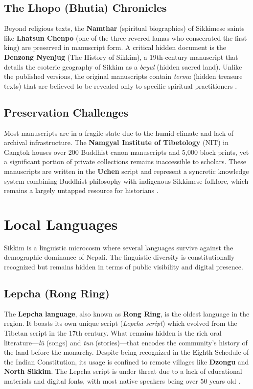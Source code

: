 \documentclass[12pt]{article}
\begin{document}
\subsection{The Lhopo (Bhutia) Chronicles}
Beyond religious texts, the \textbf{Namthar} (spiritual biographies) of Sikkimese saints like \textbf{Lhatsun Chenpo} (one of the three revered lamas who consecrated the first king) are preserved in manuscript form. A critical hidden document is the \textbf{Denzong Nyenjug} (The History of Sikkim), a 19th-century manuscript that details the esoteric geography of Sikkim as a \textit{beyul} (hidden sacred land). Unlike the published versions, the original manuscripts contain \textit{terma} (hidden treasure texts) that are believed to be revealed only to specific spiritual practitioners \cite{mullard2011}.

\subsection{Preservation Challenges}
Most manuscripts are in a fragile state due to the humid climate and lack of archival infrastructure. The \textbf{Namgyal Institute of Tibetology} (NIT) in Gangtok houses over 200 Buddhist canon manuscripts and 5,000 block prints, yet a significant portion of private collections remains inaccessible to scholars. These manuscripts are written in the \textbf{Uchen} script and represent a syncretic knowledge system combining Buddhist philosophy with indigenous Sikkimese folklore, which remains a largely untapped resource for historians \cite{nitcatalog2003}.

\section{Local Languages}
Sikkim is a linguistic microcosm where several languages survive against the demographic dominance of Nepali. The linguistic diversity is constitutionally recognized but remains hidden in terms of public visibility and digital presence.

\subsection{Lepcha (Rong Ring)}
The \textbf{Lepcha language}, also known as \textbf{Rong Ring}, is the oldest language in the region. It boasts its own unique script (\textit{Lepcha script}) which evolved from the Tibetan script in the 17th century. What remains hidden is the rich oral literature—\textit{lü} (songs) and \textit{tun} (stories)—that encodes the community's history of the land before the monarchy. Despite being recognized in the Eighth Schedule of the Indian Constitution, its usage is confined to remote villages like \textbf{Dzongu} and \textbf{North Sikkim}. The Lepcha script is under threat due to a lack of educational materials and digital fonts, with most native speakers being over 50 years old \cite{plaisier2007}.
\end{document}

